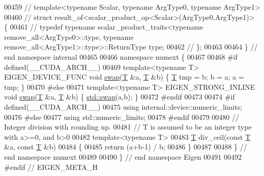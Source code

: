 \begin{DoxyCode}
00459 \textcolor{comment}{// template<typename Scalar, typename ArgType0, typename ArgType1>}
00460 \textcolor{comment}{// struct result\_of<scalar\_product\_op<Scalar>(ArgType0,ArgType1)> \{}
00461 \textcolor{comment}{// typedef typename scalar\_product\_traits<typename remove\_all<ArgType0>::type, typename
       remove\_all<ArgType1>::type>::ReturnType type;}
00462 \textcolor{comment}{// \};}
00463 
00464 \} \textcolor{comment}{// end namespace internal}
00465 
00466 \textcolor{keyword}{namespace }numext \{
00467   
00468 \textcolor{preprocessor}{#if defined(\_\_CUDA\_ARCH\_\_)}
00469 \textcolor{keyword}{template}<\textcolor{keyword}{typename} T> EIGEN\_DEVICE\_FUNC   \textcolor{keywordtype}{void} \hyperlink{endian_8c_a3ca5ecd34b04d6a243c054ac3a57f68d}{swap}(\hyperlink{group___sparse_core___module}{T} &a, \hyperlink{group___sparse_core___module}{T} &b) \{ \hyperlink{group___sparse_core___module}{T} tmp = b; b = a; a = tmp; \}
00470 \textcolor{preprocessor}{#else}
00471 \textcolor{keyword}{template}<\textcolor{keyword}{typename} T> EIGEN\_STRONG\_INLINE \textcolor{keywordtype}{void} \hyperlink{endian_8c_a3ca5ecd34b04d6a243c054ac3a57f68d}{swap}(\hyperlink{group___sparse_core___module}{T} &a, \hyperlink{group___sparse_core___module}{T} &b) \{ \hyperlink{endian_8c_a3ca5ecd34b04d6a243c054ac3a57f68d}{std::swap}(a,b); \}
00472 \textcolor{preprocessor}{#endif}
00473 
00474 \textcolor{preprocessor}{#if defined(\_\_CUDA\_ARCH\_\_)}
00475 \textcolor{keyword}{using} internal::device::numeric\_limits;
00476 \textcolor{preprocessor}{#else}
00477 \textcolor{keyword}{using} std::numeric\_limits;
00478 \textcolor{preprocessor}{#endif}
00479 
00480 \textcolor{comment}{// Integer division with rounding up.}
00481 \textcolor{comment}{// T is assumed to be an integer type with a>=0, and b>0}
00482 \textcolor{keyword}{template}<\textcolor{keyword}{typename} T>
00483 \hyperlink{group___sparse_core___module}{T} div\_ceil(\textcolor{keyword}{const} \hyperlink{group___sparse_core___module}{T} &a, \textcolor{keyword}{const} \hyperlink{group___sparse_core___module}{T} &b)
00484 \{
00485   \textcolor{keywordflow}{return} (a+b-1) / b;
00486 \}
00487 
00488 \} \textcolor{comment}{// end namespace numext}
00489 
00490 \} \textcolor{comment}{// end namespace Eigen}
00491 
00492 \textcolor{preprocessor}{#endif // EIGEN\_META\_H}
\end{DoxyCode}
